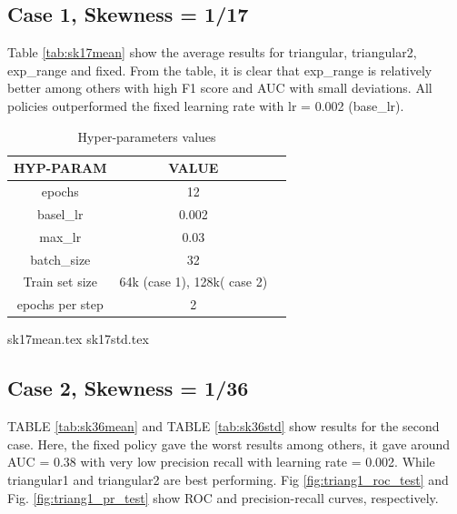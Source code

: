 \documentclass[journal, a4paper]{IEEEtran}
\begin{document}
\subsection{Case 1, Skewness = 1/17}
Table \ref{tab:sk17mean} show the average results for triangular, triangular2, exp\_range and fixed. From the table, it is clear that exp\_range is relatively better among others with high F1 score and AUC with small deviations.
All policies outperformed the fixed learning rate with lr = 0.002 (base\_lr).
\begin{table}[h]
    \centering
    \begin{tabular}{c|c|c}
        \textbf{\uppercase {Hyp-Param}} & \textbf{\uppercase{Value}} \\ \hline
        epochs              &  12                     \\ \hline
        basel\_lr           &   0.002                          \\ \hline
        max\_lr             &  0.03     \\ \hline
        batch\_size         & 32                \\ \hline
        Train set size      &64k (case 1), 128k( case 2)                 \\ \hline
        epochs per step     &  2              \\ \hline
    \end{tabular}
    \caption{Hyper-parameters values}
    \label{tab:hyper_val}
\end{table}
{sk17mean.tex}
{sk17std.tex}
\subsection{Case 2, Skewness = 1/36}
TABLE \ref{tab:sk36mean} and TABLE \ref{tab:sk36std} show results for the second case.
Here, the fixed policy gave the worst results among others, it gave around AUC = 0.38 with very low precision recall with learning rate = 0.002. While triangular1 and triangular2 are best performing. Fig \ref{fig:triang1_roc_test} and Fig. \ref{fig:triang1_pr_test} show ROC and precision-recall curves, respectively.
\end{document}
